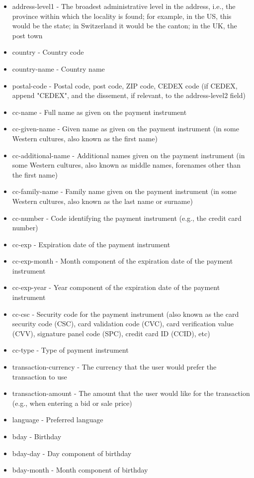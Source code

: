 \begin{itemize}
\item address-level1 - The broadest administrative level in the address, i.e., the province within which the locality is found; for example, in the US, this would be the state; in Switzerland it would be the canton; in the UK, the post town
\item country - Country code
\item country-name - Country name
\item postal-code - Postal code, post code, ZIP code, CEDEX code (if CEDEX, append "CEDEX", and the dissement, if relevant, to the address-level2 field)
\item cc-name - Full name as given on the payment instrument
\item cc-given-name - Given name as given on the payment instrument (in some Western cultures, also known as the first name)
\item cc-additional-name - Additional names given on the payment instrument (in some Western cultures, also known as middle names, forenames other than the first name)
\item cc-family-name - Family name given on the payment instrument (in some Western cultures, also known as the last name or surname)
\item cc-number - Code identifying the payment instrument (e.g., the credit card number)
\item cc-exp - Expiration date of the payment instrument
\item cc-exp-month - Month component of the expiration date of the payment instrument
\item cc-exp-year - Year component of the expiration date of the payment instrument
\item cc-csc - Security code for the payment instrument (also known as the card security code (CSC), card validation code (CVC), card verification value (CVV), signature panel code (SPC), credit card ID (CCID), etc)
\item cc-type - Type of payment instrument
\item transaction-currency - The currency that the user would prefer the transaction to use
\item transaction-amount - The amount that the user would like for the transaction (e.g., when entering a bid or sale price)
\item language - Preferred language
\item bday - Birthday
\item bday-day - Day component of birthday
\item bday-month - Month component of birthday

\end{itemize}

